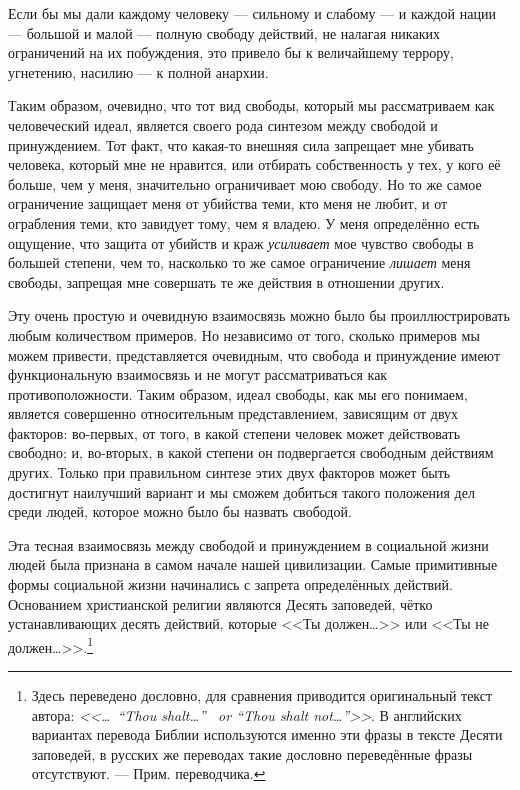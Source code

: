 Если бы мы дали каждому человеку — сильному и слабому — и каждой нации — большой и малой — полную свободу действий, не налагая никаких ограничений на их побуждения, это привело бы к величайшему террору, угнетению, насилию — к полной анархии.
 
Таким образом, очевидно, что тот вид свободы, который мы рассматриваем как человеческий идеал, является своего рода синтезом между свободой и принуждением. Тот факт, что какая-то внешняя сила запрещает мне убивать человека, который мне не нравится, или отбирать собственность у тех, у кого её больше, чем у меня, значительно ограничивает мою свободу. Но то же самое ограничение защищает меня от убийства теми, кто меня не любит, и от ограбления теми, кто завидует тому, чем я владею. У меня определённо есть ощущение, что защита от убийств и краж \textit{усиливает} мое чувство свободы в большей степени, чем то, насколько то же самое ограничение \textit{лишает} меня свободы, запрещая мне совершать те же действия в отношении других.

Эту очень простую и очевидную взаимосвязь можно было бы проиллюстрировать любым количеством примеров. Но независимо от того, сколько примеров мы можем привести, представляется очевидным, что свобода и принуждение имеют функциональную взаимосвязь и не могут рассматриваться как противоположности. Таким образом, идеал свободы, как мы его понимаем, является совершенно относительным представлением, зависящим от двух факторов: во-первых, от того, в какой степени человек может действовать свободно; и, во-вторых, в какой степени он подвергается свободным действиям других. Только при правильном синтезе этих двух факторов может быть достигнут наилучший вариант и мы сможем добиться такого положения дел среди людей, которое можно было бы назвать свободой.

Эта тесная взаимосвязь между свободой и принуждением в социальной жизни людей была признана в самом начале нашей цивилизации. Самые примитивные формы социальной жизни начинались с запрета определённых действий. Основанием христианской религии являются Десять заповедей, чётко устанавливающих десять действий, которые <<Ты должен\ldots>> или <<Ты не должен\ldots>>.\footnote{%
Здесь переведено дословно, для сравнения приводится оригинальный текст автора: \textit{<<\ldots\ ``Thou shalt\ldots'' \ or ``Thou shalt not\ldots''>>}. В английских вариантах перевода Библии используются именно эти фразы в тексте Десяти заповедей, в русских же переводах такие дословно переведённые фразы отсутствуют. — Прим. переводчика.}

